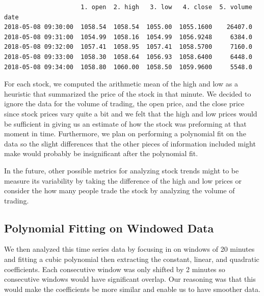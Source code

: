 \documentclass[final]{article}
\begin{document}
\begin{verbatim}
                     1. open  2. high   3. low   4. close  5. volume
date
2018-05-08 09:30:00  1058.54  1058.54  1055.00  1055.1600    26407.0
2018-05-08 09:31:00  1054.99  1058.16  1054.99  1056.9248     6384.0
2018-05-08 09:32:00  1057.41  1058.95  1057.41  1058.5700     7160.0
2018-05-08 09:33:00  1058.30  1058.64  1056.93  1058.6400     6448.0
2018-05-08 09:34:00  1058.80  1060.00  1058.50  1059.9600     5548.0
\end{verbatim}

For each stock, we computed the arithmetic mean of the high and low as a
heuristic that summarized the price of the stock in that minute. We decided to
ignore the data for the volume of trading, the open price, and the close price
since stock prices vary quite a bit and we felt that the high and low prices
would be sufficient in giving us an estimate of how the stock was preforming at
that moment in time. Furthermore, we plan on performing a polynomial fit on the
data so the slight differences that the other pieces of information included
might make would probably be insignificant after the polynomial fit.

In the future, other possible metrics for analyzing stock trends might to be
measure its variability by taking the difference of the high and low prices or
consider the how many people trade the stock by analyzing the volume of
trading.

\subsection{Polynomial Fitting on Windowed Data}

We then analyzed this time series data by focusing in on windows of 20 minutes
and fitting a cubic polynomial then extracting the constant, linear, and
quadratic coefficients. Each consecutive window was only shifted by 2 minutes
so consecutive windows would have significant overlap. Our reasoning was that
this would make the coefficients be more similar and enable us to have smoother
data.
\end{document}
